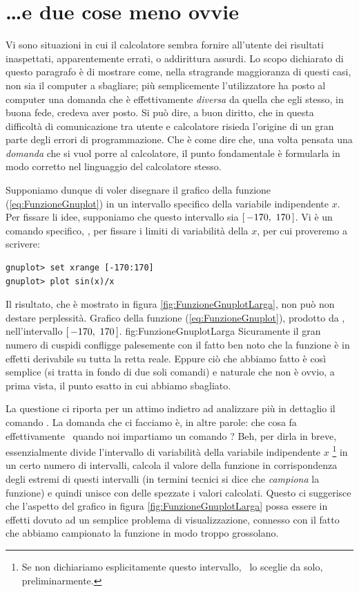 \section{\ldots e due cose meno ovvie}

Vi sono situazioni in cui il calcolatore sembra fornire all'utente dei
risultati inaspettati, apparentemente errati, o addirittura assurdi.
Lo scopo dichiarato di questo paragrafo \`e di mostrare come, nella stragrande
maggioranza di questi casi, non sia il computer a sbagliare; pi\`u
semplicemente l'utilizzatore ha posto al computer una domanda che \`e
effettivamente \emph{diversa} da quella che egli stesso, in buona fede,
credeva aver posto.
Si pu\`o dire, a buon diritto, che in questa difficolt\`a di comunicazione
tra utente e calcolatore risieda l'origine di un gran parte degli errori di
programmazione. Che \`e come dire che, una volta pensata una \emph{domanda}
che si vuol porre al calcolatore, il punto fondamentale \`e formularla in
modo corretto nel linguaggio del calcolatore stesso.

Supponiamo dunque di voler disegnare il grafico della funzione
(\ref{eq:FunzioneGnuplot}) in un intervallo specifico della variabile
indipendente $x$. Per fissare li idee, supponiamo che questo intervallo
sia $\left[ \, -170, ~ 170 \, \right]$.
Vi \`e un comando specifico, , per fissare i limiti di
variabilit\`a della $x$, per cui proveremo a scrivere:
\begin{verbatim}
gnuplot> set xrange [-170:170]
gnuplot> plot sin(x)/x
\end{verbatim}
Il risultato, che \`e mostrato in figura \ref{fig:FunzioneGnuplotLarga},
non pu\`o non destare perplessit\`a.
\panelfig
{}
{Grafico della funzione (\ref{eq:FunzioneGnuplot}), prodotto
da \gnuplot, nell'intervallo $\left[ \, -170, ~ 170 \, \right]$.}
{fig:FunzioneGnuplotLarga}
Sicuramente il gran numero di cuspidi confligge palesemente con il fatto ben
noto che la funzione \`e in effetti derivabile su tutta la retta reale.
Eppure ci\`o che abbiamo fatto \`e cos\`i semplice (si tratta in fondo di due
soli comandi) e naturale che non \`e ovvio, a prima vista, il punto esatto in
cui abbiamo sbagliato.

La questione ci riporta per un attimo indietro ad analizzare pi\`u in dettaglio
il comando . La domanda che ci facciamo \`e, in altre parole:
che cosa fa effettivamente \gnuplot\ quando noi impartiamo un comando
?
Beh, per dirla in breve, essenzialmente divide l'intervallo di variabilit\`a
della variabile indipendente $x$%
\footnote{
Se non dichiariamo esplicitamente questo intervallo, \gnuplot\ lo sceglie da
solo, preliminarmente.
}
in un certo numero di intervalli, calcola il valore della funzione in
corrispondenza degli estremi di questi intervalli (in termini tecnici si dice
che \emph{campiona} la funzione) e quindi unisce con delle spezzate
i valori calcolati. Questo ci suggerisce che l'aspetto del grafico in figura
\ref{fig:FunzioneGnuplotLarga} possa essere in effetti dovuto ad un semplice
problema di visualizzazione, connesso con il fatto che abbiamo campionato la
funzione in modo troppo grossolano.


